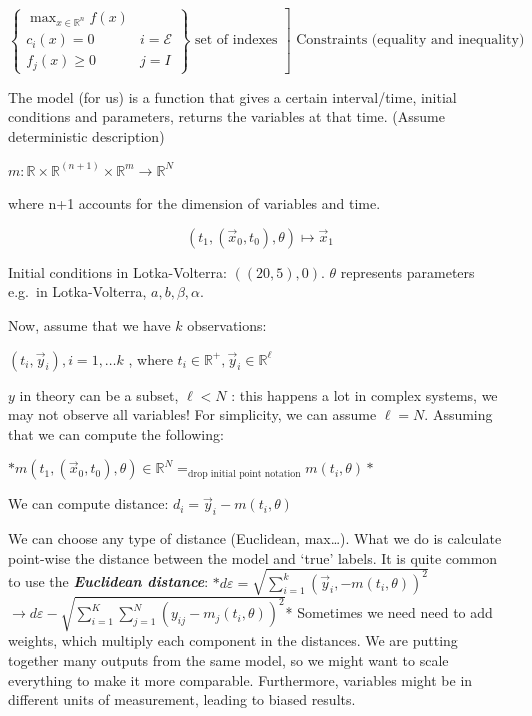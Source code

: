 $\left.\left\{\begin{array}{ll} \max _{x \in \mathbb{R}^n} f(x) & \\ c_i(x)=0 & i=\mathcal{E}\\ f_j(x) \geq 0 & j = I \end{array}\right\} \text { set of indexes }\right] \text { Constraints (equality and inequality) }$

The model (for us) is a function that gives a certain interval/time,
initial conditions and parameters, returns the variables at that time.
(Assume deterministic description)

$m: \mathbb{R} \times \mathbb{R}^{(n+1)} \times \mathbb{R}^m \rightarrow \mathbb{R}^N$

where n+1 accounts for the dimension of variables and time.

$$
\left(t_1,\left(\vec{x}_0, t_0\right), \theta\right)
\longmapsto \vec{x}_1 $$

Initial conditions in Lotka-Volterra: $((20,5), 0)$. $\theta$ represents
parameters e.g.~in Lotka-Volterra, $a,b,\beta,\alpha$.

Now, assume that we have $k$ observations:

$(t_i ,\vec{y}_i), i=1, \ldots k$ , where
$t_i \in \mathbb{R}^+, \vec{y}_i \in \mathbb{R}^\ell$

$y$ in theory can be a subset, $\ell<N$ : this happens a lot in complex
systems, we may not observe all variables! For simplicity, we can assume
$\ell=N$. Assuming that we can compute the following:

$*m\left(t_1,\left(\vec{x}_0, t_0\right), \theta\right) \in \mathbb{R}^{N} =_{\text{drop initial point notation}} m(t_i,\theta)*$

We can compute distance: \emph{$d_i=\vec{y}_i-m(t_i, \theta)$}

We can choose any type of distance (Euclidean, max\ldots). What we do is
calculate point-wise the distance between the model and `true' labels.
It is quite common to use the \textbf{\emph{Euclidean distance}}:
$*d \varepsilon =\sqrt{\sum_{i=1}^k(\vec{y}_i,-m(t_i, \theta))^2}$
$\rightarrow d{\varepsilon}-\sqrt{\sum_{i=1}^{K} \sum_{j=1}^{N} \left(y_{ij}-m_j\left(t_i, \theta\right)\right)^2}$*
Sometimes we need need to add weights, which multiply each component in
the distances. We are putting together many outputs from the same model,
so we might want to scale everything to make it more comparable.
Furthermore, variables might be in different units of measurement,
leading to biased results.

